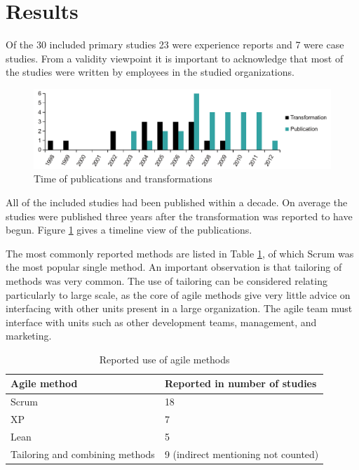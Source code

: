 \documentclass[lnbip]{svmultln}
\begin{document}
\section{Results}
\label{sec:results}

Of the 30 included primary studies 23 were experience reports and 7 were case
studies. From a validity viewpoint it is important to acknowledge that most of
the studies were written by employees in the studied organizations.

\begin{figure}[b]
  \begin{center}
    \includegraphics[width=1\textwidth]{publicationschart.pdf}
    \caption{Time of publications and transformations}
    \label{fig:publications}
  \end{center}
\end{figure}

All of the included studies had been published within a decade. On average the
studies were published three years after the transformation was reported to
have begun. Figure \ref{fig:publications} gives a timeline view of the
publications.

The most commonly reported methods are listed in Table \ref{table:methods}, of
which Scrum was the most popular single method. An important observation is that
tailoring of methods was very common. The use of tailoring can be considered
relating particularly to large scale, as the core of agile methods give very
little advice on interfacing with other units present in a large organization.
The agile team must interface with units such as other development teams,
management, and marketing.

\begin{table}[t]
    \begin{tabular}{ l@{ \hskip 0.4cm } l }
        \toprule
        Agile method    & Reported in number of studies   \\ \midrule
        Scrum           & 18 \\ 
        XP              & 7 \\
        Lean            & 5 \\
        Tailoring and combining methods & 9  (indirect mentioning not counted) \\
        \bottomrule
    \end{tabular}
    \caption{Reported use of agile methods}
    \label{table:methods}
\end{table}
\end{document}
